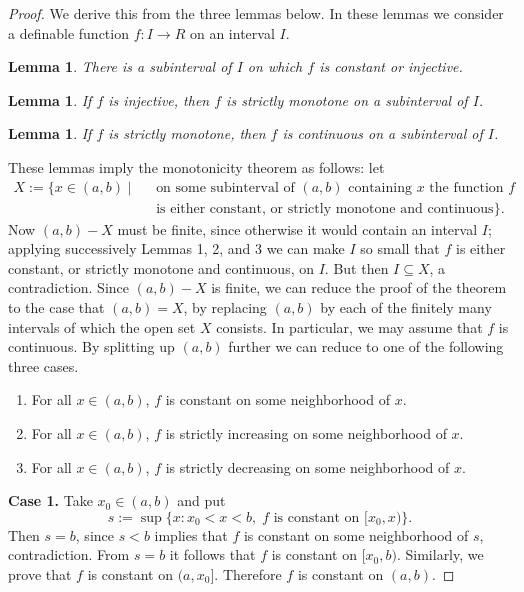 \documentclass{amsart}
\numberwithin{equation}{subsection}
\theoremstyle{plain}
\newtheorem{lemma}[subsection]{Lemma}
\theoremstyle{definition}
\theoremstyle{remark}
\begin{document}
\begin{proof} We derive this from the three lemmas below. In these lemmas we consider a definable function $f:I \to R$ on an interval $I$.
\begin{lemma}
There is a subinterval of $I$ on which $f$ is constant or injective.
\end{lemma}

\begin{lemma}
If $f$ is injective, then $f$ is strictly monotone on a subinterval of $I$.
\end{lemma}

\begin{lemma}
If $f$ is strictly monotone, then $f$ is continuous on a subinterval of $I$.
\end{lemma}
These lemmas imply the monotonicity theorem as follows: let
\[
\begin{aligned}
X := \{x \in (a,b)\mid \text{\ } & \text{on some subinterval of } (a,b) \text{ containing } x \text{ the function } f \\
& \text{is either constant, or strictly monotone and continuous}\}.
\end{aligned}
\]
Now $(a,b) - X$ must be finite, since otherwise it would contain an interval $I$; applying successively Lemmas 1, 2, and 3 we can make $I$ so small that $f$ is either constant, or strictly monotone and continuous, on $I$. But then $I \subseteq X$, a contradiction.  Since $(a,b) - X$ is finite, we can reduce the proof of the theorem to the case that $(a,b) = X$, by replacing $(a,b)$ by each of the finitely many intervals of which the open set $X$ consists. In particular, we may assume that $f$ is continuous. By splitting up $(a,b)$ further we can reduce to one of the following three cases.
\begin{enumerate}
\item[\textbf{Case 1.}] For all $x \in (a,b)$, $f$ is constant on some neighborhood of $x$.

\item[\textbf{Case 2.}] For all $x \in (a,b)$, $f$ is strictly increasing on some neighborhood of $x$.

\item[\textbf{Case 3.}] For all $x \in (a,b)$, $f$ is strictly decreasing on some neighborhood of $x$.
\end{enumerate}
\noindent\textbf{Case 1.} Take $x_0 \in (a,b)$ and put
\[ s := \sup\{x : x_0 < x < b, \; f \text{ is constant on } [x_0, x)\}. \]
Then $s = b$, since $s < b$ implies that $f$ is constant on some neighborhood of $s$, contradiction. From $s = b$ it follows that $f$ is constant on $[x_0, b)$. Similarly, we prove that $f$ is constant on $(a, x_0]$. Therefore $f$ is constant on $(a, b)$. 


\end{proof}
\end{document}
